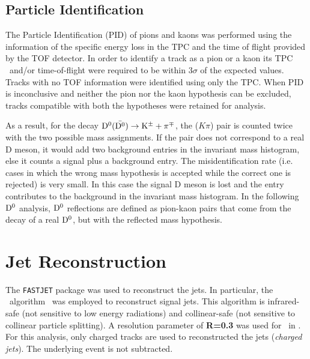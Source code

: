 \subsection{Particle Identification}

The Particle Identification (PID) of pions and kaons was performed using the information of the specific energy loss 
in the TPC and the time of flight provided by the TOF detector. 
In order to identify a track as a pion or a kaon its TPC \dedx\ and/or time-of-flight were required to be within 3$\sigma$ of the expected values. 
Tracks with no TOF information were identified using only the TPC.
When PID is inconclusive and neither the pion nor the kaon hypothesis can be excluded, tracks compatible with both the hypotheses 
were retained for analysis.

As a result, for the decay $\mathrm{D^{0}} (\bar{\mathrm{D^{0}}}) \to {\rm K}^{\pm} + \pi^{\mp}$, the ($K\pi$) pair is counted twice with the two possible mass assignments. If the pair does not correspond
to a real D meson, it would add two background entries in the invariant mass histogram, else it 
counts a signal plus a background entry. 
The misidentification rate (i.e. cases in which the wrong mass
hypothesis is accepted while the correct one is rejected) is very small. In this case the signal D meson
is lost and the entry contributes to the background in the invariant mass histogram. In the following $\mathrm{D^{0}}$ analysis, $\mathrm{D^{0}}$
reflections are defined as pion-kaon pairs that come from the decay of a real $\mathrm{D^{0}}$, but with the reflected mass hypothesis.



\section{Jet Reconstruction}

The \texttt{FASTJET}\cite{Cacciari:2012} package was used to reconstruct the jets. 
In particular, the \antikt\ algorithm~\cite{Cacciari:2008c} was employed to reconstruct signal jets. 
This algorithm is infrared-safe (not sensitive to low energy radiations) and collinear-safe (not sensitive to collinear particle splitting).
A resolution parameter of {\textbf{R=0.3}} was used for \Dzero\ in \pp.
For this analysis, only charged tracks are used to reconstructed the jets (\emph{charged jets}). The underlying event is not subtracted.

